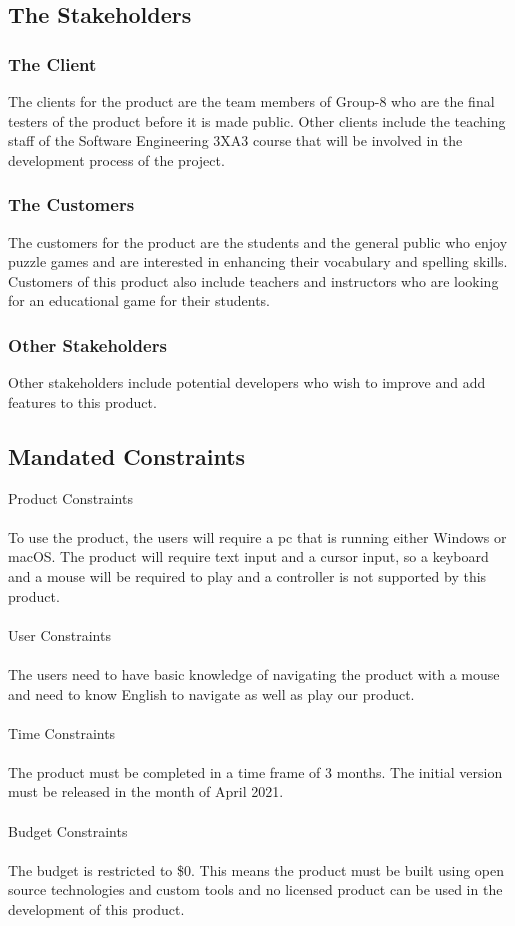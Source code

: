 \documentclass[12pt, titlepage]{article}
\begin{document}
\subsection{The Stakeholders}

\subsubsection{The Client}

The clients for the product are the team members of Group-8 who are the final testers of the product before it is made public. Other clients include the teaching staff of the Software Engineering 3XA3 course that will be involved in the development process of the project.

\subsubsection{The Customers}

The customers for the product are the students and the general public who enjoy puzzle games and are interested in enhancing their vocabulary and spelling skills. Customers of this product also include teachers and instructors who are looking for an educational game for their students.

\subsubsection{Other Stakeholders}

Other stakeholders include potential developers who wish to improve and add features to this product.

\subsection{Mandated Constraints}

Product Constraints\\
\\
To use the product, the users will require a pc that is running either Windows or macOS. The product will require text input and a cursor input, so a keyboard and a mouse will be required to play and a controller is not supported by this product.\\
\\
User Constraints\\
\\
The users need to have basic knowledge of navigating the product with a mouse and need to know English to navigate as well as play our product.\\
\\
Time Constraints\\
\\
The product must be completed in a time frame of 3 months. The initial version must be released in the month of April 2021.\\
\\
Budget Constraints\\
\\
The budget is restricted to \$0. This means the product must be built using open source technologies and custom tools and no licensed product can be used in the development of this product.
\end{document}
